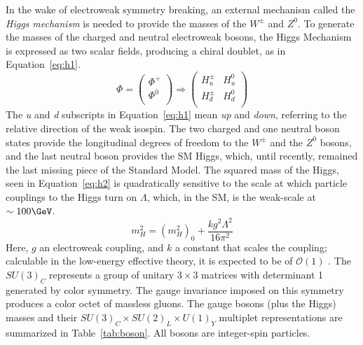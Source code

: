 In the wake of electroweak symmetry breaking, an external mechanism called the \textit{Higgs mechanism} is needed to provide the masses of the $W^\pm$ and $Z^0$.  To generate the masses of the charged and neutral electroweak bosons, the Higgs Mechanism is expressed as two scalar fields, producing a chiral doublet, as in Equation~\ref{eq:h1}.
\begin{equation}
\Phi= \begin{pmatrix}
\Phi^+ \\
\Phi^0 \\
\end{pmatrix} \Rightarrow
\begin{pmatrix}
H^\pm_u & H^0_u \\
H^\pm_d & H^0_d  \\
\end{pmatrix}
\label{eq:h1}
\end{equation}
The \textit{u} and \textit{d} subscripts in Equation~\ref{eq:h1} mean \textit{up} and \textit{down}, referring to the relative direction of the weak isospin.  The two charged and one neutral boson states provide the longitudinal degrees of freedom to the $W^\pm$ and the $Z^0$ bosons, and the last neutral boson provides the SM Higgs, which, until recently, remained the last missing piece of the Standard Model.  The squared mass of the Higgs, seen in Equation~\ref{eq:h2} is quadratically sensitive to the scale at which particle couplings to the Higgs turn on $\Lambda$, which, in the SM, is the weak-scale at $\sim 100\GeV$. 
 \begin{equation}
 m_H^2 = (m_H^2)_0+\frac{kg^2\Lambda^2}{16\pi^2}
 \label{eq:h2}
 \end{equation}
  Here, $g$ an electroweak coupling, and $k$ a constant that scales the coupling; calculable in the low-energy effective theory, it is expected to be of $\mathcal{O}(1)$ \cite{haber}. 
The $SU(3)_C$ represents a group of unitary $3\times3$ matrices with determinant 1 generated by color symmetry.  The gauge invariance imposed on this symmetry produces a color octet of massless gluons.  The gauge bosons (plus the Higgs) masses and their $SU(3)_{C} \times SU(2)_{L} \times U(1)_{Y}$ multiplet representations are summarized in Table~\ref{tab:boson}.  All bosons are integer-spin particles.      
